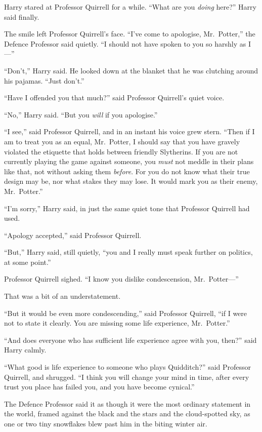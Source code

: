 Harry stared at Professor Quirrell for a while. ``What are you
\emph{doing} here?'' Harry said finally.

The smile left Professor Quirrell's face. ``I've come to apologise,
Mr.~Potter,'' the Defence Professor said quietly. ``I should not have
spoken to you so harshly as I---''

``Don't,'' Harry said. He looked down at the blanket that he was
clutching around his pajamas. ``Just don't.''

``Have I offended you that much?'' said Professor Quirrell's quiet
voice.

``No,'' Harry said. ``But you \emph{will} if you apologise.''

``I see,'' said Professor Quirrell, and in an instant his voice grew
stern. ``Then if I am to treat you as an equal, Mr.~Potter, I should say
that you have gravely violated the etiquette that holds between friendly
Slytherins. If you are not currently playing the game against someone,
you \emph{must} not meddle in their plans like that, not without asking
them \emph{before}. For you do not know what their true design may be,
nor what stakes they may lose. It would mark you as their enemy,
Mr.~Potter.''

``I'm sorry,'' Harry said, in just the same quiet tone that Professor
Quirrell had used.

``Apology accepted,'' said Professor Quirrell.

``But,'' Harry said, still quietly, ``you and I really must speak
further on politics, at some point.''

Professor Quirrell sighed. ``I know you dislike condescension,
Mr.~Potter---''

That was a bit of an understatement.

``But it would be even more condescending,'' said Professor Quirrell,
``if I were not to state it clearly. You are missing some life
experience, Mr.~Potter.''

``And does everyone who has sufficient life experience agree with you,
then?'' said Harry calmly.

``What good is life experience to someone who plays Quidditch?'' said
Professor Quirrell, and shrugged. ``I think you will change your mind in
time, after every trust you place has failed you, and you have become
cynical.''

The Defence Professor said it as though it were the most ordinary
statement in the world, framed against the black and the stars and the
cloud-spotted sky, as one or two tiny snowflakes blew past him in the
biting winter air.

